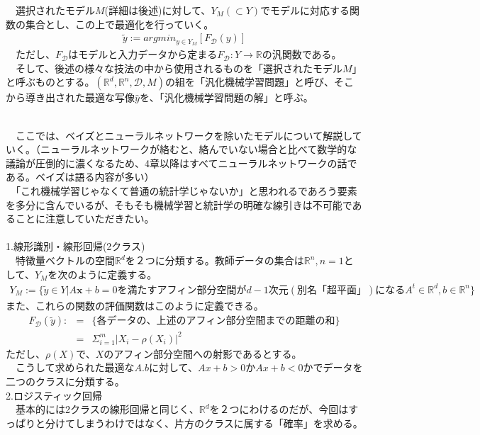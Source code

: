 \documentclass{jsarticle}
\begin{document}
　選択されたモデル$M$(詳細は後述)に対して、$Y_M(\subset Y)$でモデルに対応する関数の集合とし、この上で最適化を行っていく。\\
\begin{eqnarray}
\tilde{y}:=argmin_{y\in Y_M}[F_\mathcal{D}(y)]
\end{eqnarray}
　ただし、$F_\mathcal{D}$はモデルと入力データから定まる$F_\mathcal{D}:Y\rightarrow\mathbb{R}$の汎関数である。\\
　そして、後述の様々な技法の中から使用されるものを「選択されたモデル$M$」と呼ぶものとする。$(\mathbb{R}^d,\mathbb{R}^n,\mathcal{D},M)$の組を「汎化機械学習問題」と呼び、そこから導き出された最適な写像$\hat{y}$を、「汎化機械学習問題の解」と呼ぶ。

\newpage
\scalebox{1.1}{2.モデル設定}\\
　ここでは、ベイズとニューラルネットワークを除いたモデルについて解説していく。（ニューラルネットワークが絡むと、絡んでいない場合と比べて数学的な議論が圧倒的に濃くなるため、4章以降はすべてニューラルネットワークの話である。ベイズは語る内容が多い）\\
　「これ機械学習じゃなくて普通の統計学じゃないか」と思われるであろう要素を多分に含んでいるが、そもそも機械学習と統計学の明確な線引きは不可能であることに注意していただきたい。\\
　\\
1.線形識別・線形回帰(2クラス)\\
　特徴量ベクトルの空間$\mathbb{R}^d$を２つに分類する。教師データの集合は$\mathbb{R}^n,n=1$として、$Y_M$を次のように定義する。
\begin{eqnarray}
Y_M:=\{\tilde{y}\in Y|A\bm{x}+b=0を満たすアフィン部分空間がd-1次元(別名「超平面」)になるA^t\in \mathbb{R}^d,b\in\mathbb{R}^n \}
\end{eqnarray}
また、これらの関数の評価関数はこのように定義できる。
\begin{eqnarray}
F_\mathcal{D}(\tilde{y}):&=&\{各データの、上述のアフィン部分空間までの距離の和\}\nonumber\\
&=&\Sigma_{i=1}^m |X_i-\rho(X_i)|^2
\end{eqnarray}
ただし、$\rho(X)$で、$X$のアフィン部分空間への射影であるとする。\\
　こうして求められた最適な$A.b$に対して、$Ax+b>0$か$Ax+b<0$かでデータを二つのクラスに分類する。
　\\
2.ロジスティック回帰\\
　基本的には2クラスの線形回帰と同じく、$\mathbb{R}^d$を２つにわけるのだが、今回はすっぱりと分けてしまうわけではなく、片方のクラスに属する「確率」を求める。\\
 
\end{document}
